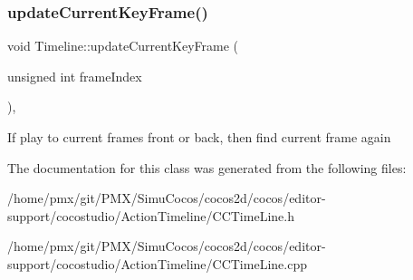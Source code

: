 \subsubsection{\texorpdfstring{update\+Current\+Key\+Frame()}{updateCurrentKeyFrame()}}
{\footnotesize\ttfamily void Timeline\+::update\+Current\+Key\+Frame (\begin{DoxyParamCaption}\item[{unsigned int}]{frame\+Index }\end{DoxyParamCaption})\hspace{0.3cm}{\ttfamily [protected]}, {\ttfamily [virtual]}}

If play to current frame\textquotesingle{}s front or back, then find current frame again 

The documentation for this class was generated from the following files\+:\begin{DoxyCompactItemize}
\item 
/home/pmx/git/\+P\+M\+X/\+Simu\+Cocos/cocos2d/cocos/editor-\/support/cocostudio/\+Action\+Timeline/C\+C\+Time\+Line.\+h\item 
/home/pmx/git/\+P\+M\+X/\+Simu\+Cocos/cocos2d/cocos/editor-\/support/cocostudio/\+Action\+Timeline/C\+C\+Time\+Line.\+cpp\end{DoxyCompactItemize}
